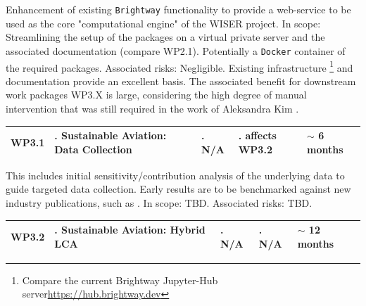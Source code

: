 \documentclass{article}
\begin{document}
    Enhancement of existing \texttt{Brightway} functionality to provide a web-service to be used as the core "computational engine" of the WISER project. In scope: Streamlining the setup of the packages on a virtual private server and the associated documentation (compare WP2.1). Potentially a \texttt{Docker} container of the required packages. Associated risks: Negligible. Existing infrastructure \footnote{Compare the current Brightway Jupyter-Hub server\url{https://hub.brightway.dev}} and documentation provide an excellent basis. The associated benefit for downstream work packages WP3.X is large, considering the high degree of manual intervention that was still required in the work of Aleksandra Kim \cite{paulillo_influential_2021}.

    \begin{table}[H]
        \centering
        \begin{tabularx}{\linewidth}{
            |>{\hsize=0.25\hsize}X
            |>{\hsize=1.\hsize}X
            |>{\hsize=1.\hsize}X
            |>{\hsize=1.\hsize}X
            |>{\hsize=0.75\hsize}X|
          } %
            \hline
                WP3.1
            &
                Sustainable Aviation: \newline Data Collection
            &
                N/A
            &
                affects WP3.2
            &
                $\sim$ 6 months
            \\
            \hline
        \end{tabularx}
    \end{table}
    \vspace*{-9pt}
    
    This includes initial sensitivity/contribution analysis of the underlying data to guide targeted data collection. Early results are to be benchmarked against new industry publications, such as \cite{noauthor_challenger_2022}. In scope: TBD. Associated risks: TBD.
    
    \begin{table}[H]
        \centering
        \begin{tabularx}{\linewidth}{
            |>{\hsize=0.25\hsize}X
            |>{\hsize=1.\hsize}X
            |>{\hsize=1.\hsize}X
            |>{\hsize=1.\hsize}X
            |>{\hsize=0.75\hsize}X|
          } %
            \hline
                WP3.2
            &
                Sustainable Aviation: \newline Hybrid LCA
            &
                N/A
            &
                N/A
            &
                $\sim$ 12 months
            \\
            \hline
        \end{tabularx}
    \end{table}
    
\end{document}
